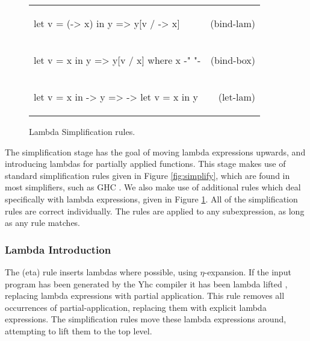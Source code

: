 \documentclass[preprint]{sigplanconf}
\newcommand{\simp}[2]{\vspace{-7mm} #2 & (#1) \\}
\newenvironment{simplify}
    {\noindent
     \begin{flushright}
     \begin{tabular}{p{6.5cm}r}
    }
    {\end{tabular}
     \vspace{-7mm}
     \end{flushright}
    }
\begin{document}
\begin{figure}
\begin{simplify}

\simp{bind-lam}{
\ignore\begin{code}
let v = (\w -> x) in y
    => y[v / \w -> x]
\end{code}}

\simp{bind-box}{
\ignore\begin{code}
let v = x in y
    => y[v / x]
    where x {-" \text{ is a boxed lambda (see \S\ref{sec:inlining})} "-}
\end{code}}

\simp{let-lam}{
\ignore\begin{code}
let v = x in \w -> y
    => \w -> let v = x in y
\end{code}}

\end{simplify}
\caption{Lambda Simplification rules.}
\label{fig:lambda_simplify}
\end{figure}

The simplification stage has the goal of moving lambda expressions upwards, and introducing lambdas for partially applied functions. This stage makes use of standard simplification rules given in Figure \ref{fig:simplify}, which are found in most simplifiers, such as GHC \cite{spj:transformation}. We also make use of additional rules which deal specifically with lambda expressions, given in Figure \ref{fig:lambda_simplify}. All of the simplification rules are correct individually. The rules are applied to any subexpression, as long as any rule matches. 

\subsubsection{Lambda Introduction}

The (eta) rule inserts lambdas where possible, using $\eta$-expansion. If the input program has been generated by the Yhc compiler it has been lambda lifted \cite{lambda_lift}, replacing lambda expressions with partial application. This rule removes all occurrences of partial-application, replacing them with explicit lambda expressions. The simplification rules move these lambda expressions around, attempting to lift them to the top level.
\end{document}
